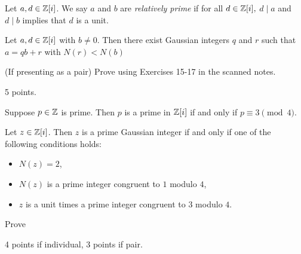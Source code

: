 \documentclass[letterpaper, 11 pt,handout]{ximera}
\begin{document}
\begin{exploration}
\begin{definition}
 Let $a,d\in\mathbb Z[i]$. We say $a$ and $b$ are \emph{relatively prime} if for all $d\in\mathbb Z[i],$ $d\mid a$ and $d\mid b$ implies that $d$ is a unit.
\end{definition}

\begin{theorem}\label{div-gauss-int}
 Let $a,d\in\mathbb Z[i]$ with $b\neq 0$. Then there exist Gaussian integers $q$ and $r$ such that $a=qb+r$ with $N(r)<N(b)$
\end{theorem}

\begin{problem}(If presenting as a pair)
Prove  using Exercises 15-17 in the scanned notes.
	\begin{rubric}
 		5 points.
	\end{rubric}
\end{problem}

\begin{theorem}[Theorem 13.5.4]
 Suppose $p\in\mathbb Z$ is prime. Then $p$ is a prime in $\mathbb Z[i]$ if and only if $p\equiv 3\pmod{4}$.
\end{theorem}



\begin{theorem}[Theorem 13.5.5]\label{thm:guass-primes}
 Let $z\in\mathbb Z[i]$. Then $z$ is a prime Gaussian integer if and only if one of the following conditions holds:
 
\begin{itemize}
 \item $N(z)=2$,
 \item $N(z)$ is a prime integer congruent to $1$ modulo $4$,
 \item $z$ is a unit times a prime integer congruent to $3$ modulo $4$.
\end{itemize}
%
\end{theorem}

\begin{problem}
Prove 
	\begin{rubric}
 		4 points if individual, 3 points if pair.
	\end{rubric}
\end{problem}
\end{exploration}
\end{document}
